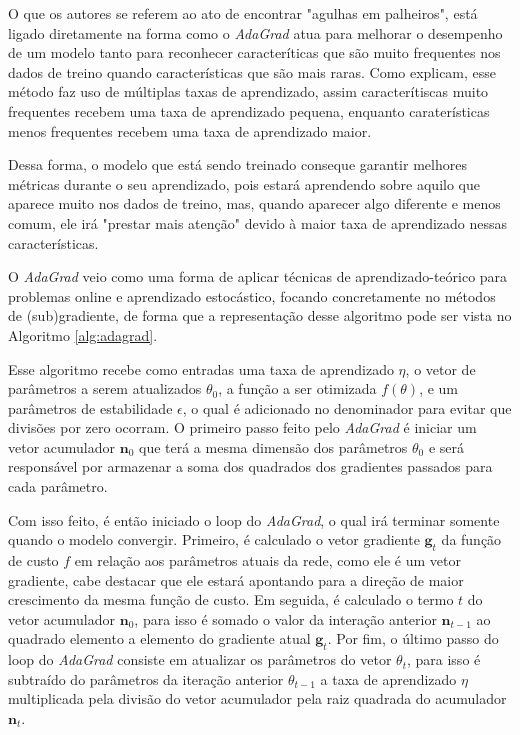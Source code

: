 O que os autores se referem ao ato de encontrar "agulhas em palheiros", está ligado diretamente na forma como o \textit{AdaGrad} atua para melhorar o desempenho de um modelo tanto para reconhecer caracteríticas que são muito frequentes nos dados de treino quando características que são mais raras. Como \textcite{AdaGradMethod} explicam, esse método faz uso de múltiplas taxas de aprendizado, assim caracterítiscas muito frequentes recebem uma taxa de aprendizado pequena, enquanto caraterísticas menos frequentes recebem uma taxa de aprendizado maior.

Dessa forma, o modelo que está sendo treinado conseque garantir melhores métricas durante o seu aprendizado, pois estará aprendendo sobre aquilo que aparece muito nos dados de treino, mas, quando aparecer algo diferente e menos comum, ele irá "prestar mais atenção" devido à maior taxa de aprendizado nessas características.

O \textit{AdaGrad} veio como uma forma de aplicar técnicas de aprendizado-teórico para problemas online e aprendizado estocástico, focando concretamente no métodos de (sub)gradiente, de forma que a representação desse algoritmo pode ser vista no Algoritmo \ref{alg:adagrad}.

Esse algoritmo recebe como entradas uma taxa de aprendizado $\eta$, o vetor de parâmetros a serem atualizados $\theta_0$, a função a ser otimizada $f(\theta)$, e um parâmetros de estabilidade $\epsilon$, o qual é adicionado no denominador para evitar que divisões por zero ocorram. O primeiro passo feito pelo \textit{AdaGrad} é iniciar um vetor acumulador $\mathbf{n}_0$ que terá a mesma dimensão dos parâmetros $\theta_0$ e será responsável por armazenar a soma dos quadrados dos gradientes passados para cada parâmetro.

Com isso feito, é então iniciado o loop do \textit{AdaGrad}, o qual irá terminar somente quando o modelo convergir. Primeiro, é calculado o vetor gradiente $\textbf{g}_t$ da função de custo $f$ em relação aos parâmetros atuais da rede, como ele é um vetor gradiente, cabe destacar que ele estará apontando para a direção de maior crescimento da mesma função de custo. Em seguida, é calculado o termo $t$ do vetor acumulador $\mathbf{n}_0$, para isso é somado o valor da interação anterior $\textbf{n}_{t-1}$ ao quadrado elemento a elemento do gradiente atual $\textbf{g}_t$. Por fim, o último passo do loop do \textit{AdaGrad} consiste em atualizar os parâmetros do vetor $\theta_t$, para isso é subtraído do parâmetros da iteração anterior $\theta_{t-1}$ a taxa de aprendizado $\eta$ multiplicada pela divisão do vetor acumulador pela raiz quadrada do acumulador $\textbf{n}_t$.


